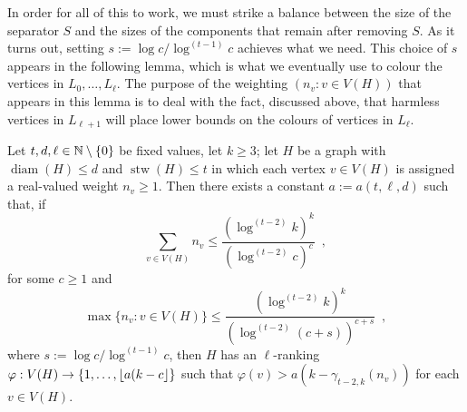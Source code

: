 \documentclass[kpfonts]{patmorin}
\DeclareMathOperator{\diam}{diam}
\DeclareMathOperator{\stw}{stw}
\theoremstyle{named}
\begin{document}
In order for all of this to work, we must strike a balance between the size of the separator $S$ and the sizes of the components that remain after removing $S$.  As it turns out, setting $s:=\log c/\log^{(t-1)} c$ achieves what we need.  This choice of $s$ appears in the following lemma, which is what we eventually use to colour the vertices in $L_0,\ldots,L_\ell$.  The purpose of the weighting $(n_v:v\in V(H))$ that appears in this lemma is to deal with the fact, discussed above, that harmless vertices in $L_{\ell+1}$ will place lower bounds on the colours of vertices in $L_{\ell}$.



\begin{lem}\label{t-tree-slack}
    Let $t,d,\ell\in\mathbb{N}\setminus\{0\}$ be fixed values, let $k\ge 3$; let $H$ be a graph with $\diam(H)\le d$ and $\stw(H)\le t$ in which each vertex $v\in V(H)$ is assigned a real-valued weight $n_v\ge 1$. Then there exists a constant $a:=a(t,\ell,d)$ such that, if
    \begin{equation}
         \sum_{v\in V(H)} n_v \le \frac{(\log^{(t-2)} k)^k}{(\log^{(t-2)} c)^{c}} \enspace ,
     \label{total-weight}
    \end{equation}
    for some $c\ge 1$ and
    \begin{equation}
         \max\{n_v:v\in V(H)\} \le \frac{(\log^{(t-2)} k)^k}{(\log^{(t-2)} (c+s))^{c+s}} \enspace ,
     \label{max-weight}
    \end{equation}
    where $s := \log c/\log^{(t-1)} c$, then $H$ has an $\ell$-ranking $\varphi:V(H)\to\{1,\ldots, {\lfloor a(k-c \rfloor}\}$ such that $\varphi(v)> a(k-\gamma_{t-2,k}(n_v))$ for each $v\in V(H)$.
\end{lem}
\end{document}
